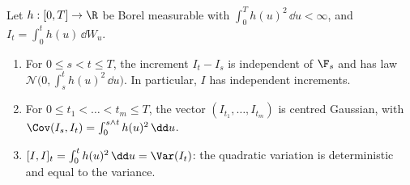 \begin{proposition}\label{prop:ito-deterministic}
Let $h:[0,T]\to\R$ be Borel measurable with $\int_0^Th(u)^2\,\dd u<\infty$, and
$I_t=\int_0^th(u)\,\dd W_u$.
\begin{enumerate}[label=(\roman*)]
  \item For $0\le s<t\le T$, the increment $I_t-I_s$ is independent of $\F_s$ and has law
    $\mathcal N\big(0,\int_s^th(u)^2\,\dd u\big)$. In particular, $I$ has independent
    increments.
  \item For $0\le t_1<\dots<t_m\le T$, the vector $(I_{t_1},\dots,I_{t_m})$ is centred
    Gaussian, with $\Cov(I_s,I_t)=\int_0^{s\wedge t}h(u)^2\,\dd u$.
  \item $[I,I]_t=\int_0^th(u)^2\,\dd u=\Var(I_t)$: the quadratic variation is deterministic and
    equal to the variance.
\end{enumerate}
\end{proposition}

